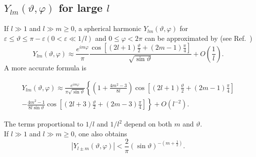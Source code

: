 \subsection{$Y_{l m}(\vartheta, \varphi)$ for large $l$}\label{sec:5.12.1}
If $l \gg 1$ and $l \gg m \geq 0$, a spherical harmonic $Y_{l m}(\vartheta, \varphi)$ for $\varepsilon \leq \vartheta \leq \pi-\varepsilon(0<\varepsilon \ll 1 / l)$ and $0 \leq \varphi<2 \pi$ can be approximated by (see Ref.~\cite{ref004})
\begin{equation}
Y_{l m}(\vartheta, \varphi) \approx \frac{e^{i m \varphi}}{\pi} \frac{\cos \left[(2 l+1) \frac{\vartheta}{2}+(2 m-1) \frac{\pi}{4}\right]}{\sqrt{\sin \vartheta}}+O\left(\frac{1}{l}\right) . \label{eq:5:12:1}
\end{equation}
A more accurate formula \cite{ref022} is
\begin{corrected}
\begin{equation}
\begin{aligned}
Y_{l m}(\vartheta, \varphi) \approx \frac{e^{i m \varphi}}{\pi \sqrt{\sin \vartheta}}\left\{\left(1+\frac{4 m^{2}-3}{8 l}\right) \cos \left[(2 l+1) \frac{\vartheta}{2}+(2 m-1) \frac{\pi}{4}\right]\right. \\
\left.-\frac{4 m^{2}-1}{8 l \sin \vartheta} \cos \left[(2 l+3) \frac{\vartheta}{2}+(2 m-3) \frac{\pi}{4}\right]\right\}+O\left(l^{-2}\right).
\end{aligned} \label{eq:5:12:2}
\end{equation}
\end{corrected}
The terms proportional to $1 / l$ and $1 / l^{2}$ depend on both $m$ and $\vartheta$.\\
If $l \gg 1$ and $l \gg m \geq 0$, one also obtains
\begin{equation}
\left|Y_{l \pm m}(\vartheta, \varphi)\right|<\frac{2}{\pi}(\sin \vartheta)^{-\left(m+\frac{1}{2}\right)} . \label{eq:5:12:3}
\end{equation}
